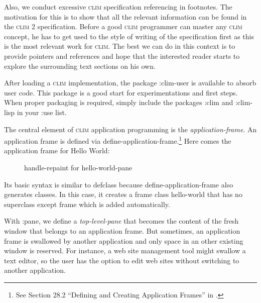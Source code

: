 \documentclass[twocolumn,a4paper]{article}
\newcommand {\concept} [1] {{\sl #1}\index{#1}}
\newcommand {\code}[1]{{\sffamily #1}}
\newcommand {\CLIM}{\textsc{clim}}
\let\class\code
\let\method\code
\let\keyword\code
\begin{document}
Also, we conduct excessive \CLIM{} specification referencing in
footnotes. The motivation for this is to show that all the relevant
information can be found in the \CLIM{} 2
specification\cite{clim-spec}. Before a good \CLIM{} programmer can
master any \CLIM{} concept, he has to get used to the style of writing
of the specification first as this is the most relevant work for
\CLIM{}. The best we can do in this context is to provide pointers and
references and hope that the interested reader starts to explore the
surrounding text sections on his own.

After loading a \CLIM{} implementation, the package
\keyword{:clim-user} is available to absorb user code. This package is
a good start for experimentations and first steps. When proper
packaging is required, simply include the packages \keyword{:clim} and
\keyword{:clim-lisp} in your \keyword{:use} list.

The central element of \CLIM{} application programming is the
\concept{application-frame}. An application frame is defined via
\code{define-application-frame}.\footnote{See Section 28.2 ``Defining
  and Creating Application Frames'' in \cite{clim-spec}.} Here comes
the application frame for Hello World:
\lstset{style=inlinestyle}


\begin{figure*}
\lstset{style=framestyle}

\caption{\method{handle-repaint} for \class{hello-world-pane}}\label{hello-world-repaint}
\end{figure*}
Its basic syntax is similar to \code{defclass} because
\code{define-application-frame} also generates classes. In this case,
it creates a frame class \class{hello-world} that has no superclass
except \class{frame} which is added automatically.

With \code{:pane}, we define a \concept{top-level-pane} that becomes
the content of the fresh window that belongs to an application
frame. But sometimes, an application frame is swallowed by another
application and only space in an other existing window is
reserved. For instance, a web site management tool might swallow a
text editor, so the user has the option to edit web sites without
switching to another application.

\end{document}
